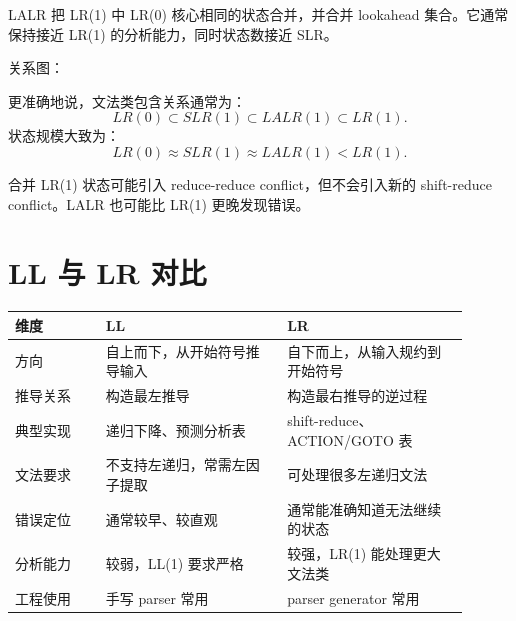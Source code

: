 \documentclass[UTF8,fontset=none,11pt]{ctexart}
\newenvironment{defbox}[1][]{%
  \par\medskip\noindent{\color{defrule}\rule{\linewidth}{1.1pt}}\par\nopagebreak
  \noindent{\bfseries\color{defrule}#1}\par\nopagebreak\smallskip}%
  {\par\nopagebreak\smallskip\noindent{\color{defrule}\rule{\linewidth}{0.4pt}}\par\medskip}
\newenvironment{warnbox}[1][]{%
  \par\medskip\noindent{\color{warnrule}\rule{\linewidth}{1.1pt}}\par\nopagebreak
  \noindent{\bfseries\color{warnrule}#1}\par\nopagebreak\smallskip}%
  {\par\nopagebreak\smallskip\noindent{\color{warnrule}\rule{\linewidth}{0.4pt}}\par\medskip}
\newcommand{\FOLLOW}{\operatorname{FOLLOW}}
\begin{document}
\begin{defbox}[LALR(1)]
LALR 把 LR(1) 中 LR(0) 核心相同的状态合并，并合并 lookahead 集合。它通常保持接近 LR(1) 的分析能力，同时状态数接近 SLR。
\end{defbox}

关系图：

\begin{center}
\end{center}

更准确地说，文法类包含关系通常为：
\[
LR(0)\subset SLR(1)\subset LALR(1)\subset LR(1).
\]
状态规模大致为：
\[
LR(0)\approx SLR(1)\approx LALR(1) < LR(1).
\]

\begin{warnbox}[LALR 的风险]
合并 LR(1) 状态可能引入 reduce-reduce conflict，但不会引入新的 shift-reduce conflict。LALR 也可能比 LR(1) 更晚发现错误。
\end{warnbox}

\section{LL 与 LR 对比}

\begin{longtable}{L{0.18\linewidth}L{0.36\linewidth}L{0.36\linewidth}}
\toprule
维度 & LL & LR \\
\midrule
方向 & 自上而下，从开始符号推导输入 & 自下而上，从输入规约到开始符号 \\
推导关系 & 构造最左推导 & 构造最右推导的逆过程 \\
典型实现 & 递归下降、预测分析表 & shift-reduce、ACTION/GOTO 表 \\
文法要求 & 不支持左递归，常需左因子提取 & 可处理很多左递归文法 \\
错误定位 & 通常较早、较直观 & 通常能准确知道无法继续的状态 \\
分析能力 & 较弱，LL(1) 要求严格 & 较强，LR(1) 能处理更大文法类 \\
工程使用 & 手写 parser 常用 & parser generator 常用 \\
\bottomrule
\end{longtable}
\end{document}
